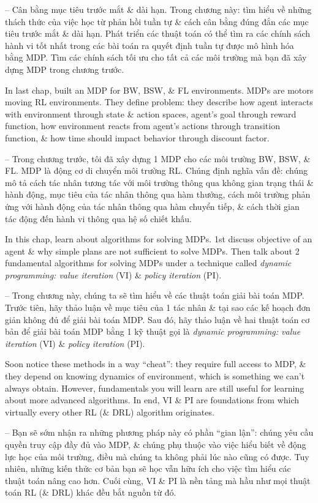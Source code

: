\documentclass{article}
\begin{document}
\begin{itemize}
    -- {\sf Cân bằng mục tiêu trước mắt \& dài hạn.} Trong chương này: tìm hiểu về những thách thức của việc học từ phản hồi tuần tự \& cách cân bằng đúng đắn các mục tiêu trước mắt \& dài hạn. Phát triển các thuật toán có thể tìm ra các chính sách hành vi tốt nhất trong các bài toán ra quyết định tuần tự được mô hình hóa bằng MDP. Tìm các chính sách tối ưu cho tất cả các môi trường mà bạn đã xây dựng MDP trong chương trước.

    In last chap, built an MDP for BW, BSW, \& FL environments. MDPs are motors moving RL environments. They define problem: they describe how agent interacts with environment through state \& action spaces, agent's goal through reward function, how environment reacts from agent's actions through transition function, \& how time should impact behavior through discount factor.

    -- Trong chương trước, tôi đã xây dựng 1 MDP cho các môi trường BW, BSW, \& FL. MDP là động cơ di chuyển môi trường RL. Chúng định nghĩa vấn đề: chúng mô tả cách tác nhân tương tác với môi trường thông qua không gian trạng thái \& hành động, mục tiêu của tác nhân thông qua hàm thưởng, cách môi trường phản ứng với hành động của tác nhân thông qua hàm chuyển tiếp, \& cách thời gian tác động đến hành vi thông qua hệ số chiết khấu.

    In this chap, learn about algorithms for solving MDPs. 1st discuss objective of an agent \& why simple plans are not sufficient to solve MDPs. Then talk about 2 fundamental algorithms for solving MDPs under a technique called {\it dynamic programming: value iteration} (VI) \& {\it policy iteration} (PI).

    -- Trong chương này, chúng ta sẽ tìm hiểu về các thuật toán giải bài toán MDP. Trước tiên, hãy thảo luận về mục tiêu của 1 tác nhân \& tại sao các kế hoạch đơn giản không đủ để giải bài toán MDP. Sau đó, hãy thảo luận về hai thuật toán cơ bản để giải bài toán MDP bằng 1 kỹ thuật gọi là {\it dynamic programming: value iteration} (VI) \& {\it policy iteration} (PI).

    Soon notice these methods in a way ``cheat'': they require full access to MDP, \& they depend on knowing dynamics of environment, which is something we can't always obtain. However, fundamentals you will learn are still useful for learning about more advanced algorithms. In end, VI \& PI are foundations from which virtually every other RL (\& DRL) algorithm originates.

    -- Bạn sẽ sớm nhận ra những phương pháp này có phần ``gian lận'': chúng yêu cầu quyền truy cập đầy đủ vào MDP, \& chúng phụ thuộc vào việc hiểu biết về động lực học của môi trường, điều mà chúng ta không phải lúc nào cũng có được. Tuy nhiên, những kiến thức cơ bản bạn sẽ học vẫn hữu ích cho việc tìm hiểu các thuật toán nâng cao hơn. Cuối cùng, VI \& PI là nền tảng mà hầu như mọi thuật toán RL (\& DRL) khác đều bắt nguồn từ đó.


\end{itemize}
\end{document}
